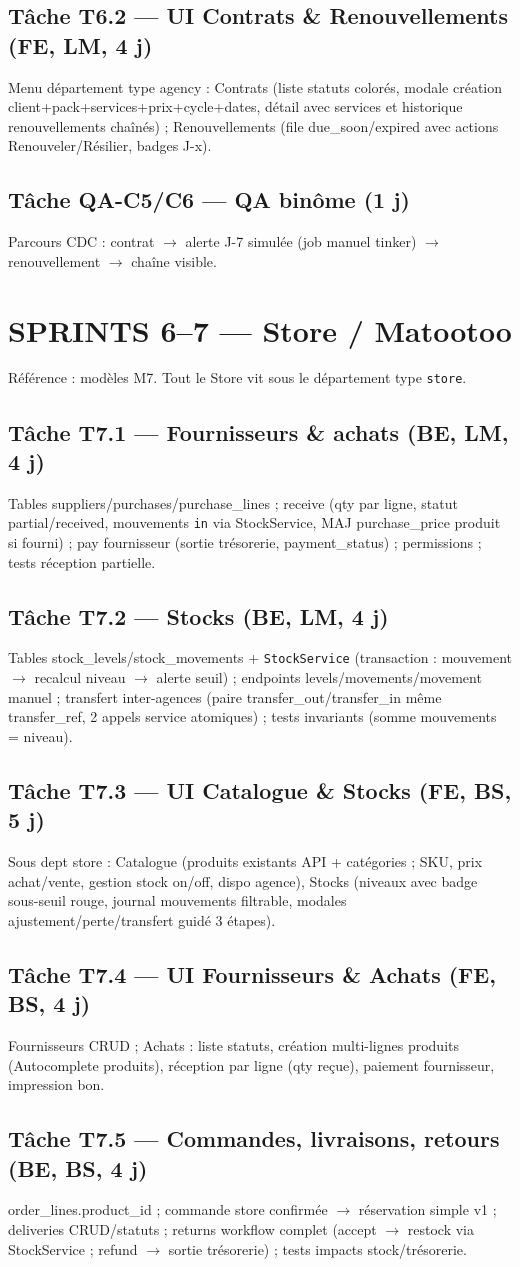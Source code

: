 \documentclass[11pt,a4paper]{article}
\newcommand{\tache}[2]{\subsection{Tâche #1 --- #2}\label{task:#1}}
\begin{document}
\tache{T6.2}{UI Contrats \& Renouvellements (FE, LM, 4 j)} Menu département type agency : Contrats (liste statuts colorés, modale création client+pack+services+prix+cycle+dates, détail avec services et historique renouvellements chaînés) ; Renouvellements (file due\_soon/expired avec actions Renouveler/Résilier, badges J-x).

\tache{QA-C5/C6}{QA binôme (1 j)} Parcours CDC : contrat $\rightarrow$ alerte J-7 simulée (job manuel tinker) $\rightarrow$ renouvellement $\rightarrow$ chaîne visible.

\section{SPRINTS 6--7 --- Store / Matootoo}

Référence : modèles M7. Tout le Store vit sous le département type \texttt{store}.

\tache{T7.1}{Fournisseurs \& achats (BE, LM, 4 j)} Tables suppliers/purchases/purchase\_lines ; receive (qty par ligne, statut partial/received, mouvements \texttt{in} via StockService, MAJ purchase\_price produit si fourni) ; pay fournisseur (sortie trésorerie, payment\_status) ; permissions ; tests réception partielle.

\tache{T7.2}{Stocks (BE, LM, 4 j)} Tables stock\_levels/stock\_movements + \verb|StockService| (transaction : mouvement $\rightarrow$ recalcul niveau $\rightarrow$ alerte seuil) ; endpoints levels/movements/movement manuel ; transfert inter-agences (paire transfer\_out/transfer\_in même transfer\_ref, 2 appels service atomiques) ; tests invariants (somme mouvements = niveau).

\tache{T7.3}{UI Catalogue \& Stocks (FE, BS, 5 j)} Sous dept store : Catalogue (produits existants API + catégories ; SKU, prix achat/vente, gestion stock on/off, dispo agence), Stocks (niveaux avec badge sous-seuil rouge, journal mouvements filtrable, modales ajustement/perte/transfert guidé 3 étapes).

\tache{T7.4}{UI Fournisseurs \& Achats (FE, BS, 4 j)} Fournisseurs CRUD ; Achats : liste statuts, création multi-lignes produits (Autocomplete produits), réception par ligne (qty reçue), paiement fournisseur, impression bon.

\tache{T7.5}{Commandes, livraisons, retours (BE, BS, 4 j)} order\_lines.product\_id ; commande store confirmée $\rightarrow$ réservation simple v1 ; deliveries CRUD/statuts ; returns workflow complet (accept $\rightarrow$ restock via StockService ; refund $\rightarrow$ sortie trésorerie) ; tests impacts stock/trésorerie.
\end{document}
